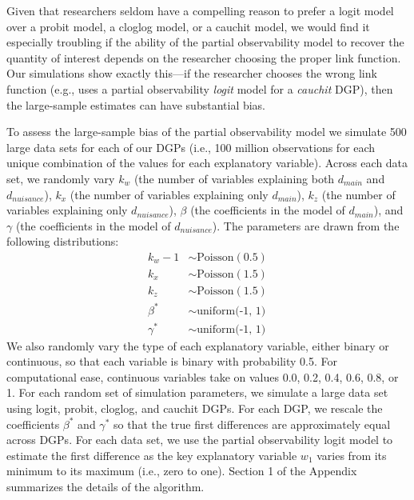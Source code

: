 \documentclass[10pt]{article}
\begin{document}
Given that researchers seldom have a compelling reason to prefer a logit model over a probit model, a cloglog model, or a cauchit model, we would find it especially troubling if the ability of the partial observability model to recover the quantity of interest depends on the researcher choosing the proper link function. 
Our simulations show exactly this---if the researcher chooses the wrong link function (e.g., uses a partial observability \textit{logit} model for a \textit{cauchit} DGP), then the large-sample estimates can have substantial bias.

To assess the large-sample bias of the partial observability model we simulate 500 large data sets for each of our DGPs (i.e., 100 million observations for each unique combination of the values for each explanatory variable). 
Across each data set, we randomly vary $k_w$ (the number of variables explaining both $d_{main}$ and $d_{nuisance}$), $k_x$ (the number of variables explaining only $d_{main}$), $k_z$ (the number of variables explaining only $d_{nuisance}$), $\beta$ (the coefficients in the model of $d_{main}$), and $\gamma$ (the coefficients in the model of $d_{nuisance}$). 
The parameters are drawn from the following distributions:
\begin{align*}
k_w - 1 &\sim \text{Poisson}(0.5)\\
k_x &\sim \text{Poisson}(1.5)\\
k_z &\sim \text{Poisson}(1.5)\\
\beta^* &\sim \text{uniform(-1, 1)}\\
\gamma^* &\sim \text{uniform(-1, 1)}
\end{align*}
We also randomly vary the type of each explanatory variable, either binary or continuous, so that each variable is binary with probability 0.5. For computational ease, continuous variables take on values 0.0, 0.2, 0.4, 0.6, 0.8, or 1.
For each random set of simulation parameters, we simulate a large data set using logit, probit, cloglog, and cauchit DGPs.  
For each DGP, we rescale the coefficients $\beta^*$ and $\gamma^*$ so that the true first differences are approximately equal across DGPs.
For each data set, we use the partial observability logit model to estimate the first difference as the key explanatory variable $w_1$ varies from its minimum to its maximum (i.e., zero to one). 
Section 1 of the Appendix summarizes the details of the algorithm.
\end{document}
